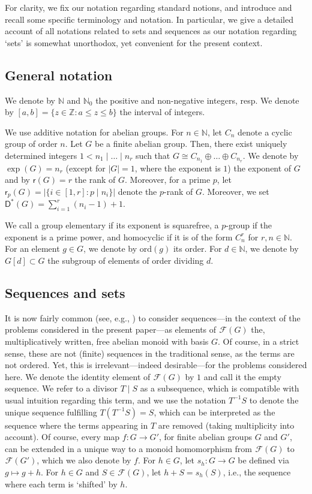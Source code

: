 \documentclass{amsart}
\theoremstyle{definition}
\numberwithin{equation}{section}
\begin{document}
For clarity, we fix our notation regarding standard notions, and
introduce and recall some specific terminology and notation.
In particular, we give a detailed account of all notations related
to sets and sequences as our notation regarding `sets' is somewhat unorthodox,
yet convenient for the present context.

\subsection{General notation}
We denote by $\mathbb{N}$ and $\mathbb{N}_0$ the positive and
non-negative integers, resp.
We denote by $[a,b]=\{z \in \mathbb{Z} \colon a \le z \le b\}$
the interval of integers.

We use additive notation for abelian groups.
For $n \in \mathbb{N}$, let $C_n$ denote a cyclic group of order $n$.
Let $G$ be a finite abelian group.
Then, there exist uniquely determined integers $1 < n_1 \mid \dots  \mid n_r $ such that
 $G\cong C_{n_1} \oplus\ldots \oplus C_{n_r}$.
We denote by  $\exp(G)=n_r$ (except for $|G|=1$, where the exponent is $1$) the exponent of $G$ and by $\mathsf{r}(G)=r$ the rank of $G$. Moreover, for a prime $p$, let $\mathsf{r}_p(G)=|\{i\in [1,r]\colon p \mid n_i\}|$ denote the $p$-rank of $G$.
Moreover, we set $\mathsf{D}^{\ast}(G)=\sum_{i=1}^r(n_i-1)+1$.

We call a group elementary if its exponent is squarefree, a $p$-group if the exponent is a prime power, and
homocyclic if it is of the form $C_n^r$ for $r,n \in \mathbb{N}$.
For an element $g\in G$, we denote by ${\mathrm{ord}}(g)$ its order.
For $d\in \mathbb{N}$, we denote by $G[d]\subset G$ the subgroup
of elements of order dividing $d$.

\subsection{Sequences and sets}

It is now fairly common (see, e.g., \cite{GaoGe1,barcelona,GeHaBOOK}) to consider sequences---in the context of the problems considered in the present paper---as elements of ${{}^{{}}\!\mathcal{F}}(G)$ the, multiplicatively written, free abelian monoid with basis $G$. Of course, in a strict sense, these are not (finite) sequences in the traditional sense, as the terms are not ordered. Yet, this is irrelevant---indeed desirable---for the problems considered here.
We denote the identity element of ${{}^{{}}\!\mathcal{F}} (G)$ by $1$ and call it the empty sequence. We refer to a divisor $T\mid S$ as a subsequence, which is compatible with usual intuition regarding this term, and we use the notation
$T^{-1}S$ to denote the unique sequence fulfilling $T (T^{-1}S)=S$, which can be interpreted as the sequence where the terms appearing in $T$ are removed (taking multiplicity into account).
Of course, every map $f:G \to G'$, for finite abelian groups $G$ and $G'$, can be extended in a unique way
to a monoid homomorphism from ${{}^{{}}\!\mathcal{F}}(G)$ to ${{}^{{}}\!\mathcal{F}}(G')$, which we also denote by $f$.
For $h\in G$, let $s_h: G \to G$ be defined via $g\mapsto g + h$. For $h \in G$ and $S \in {{}^{{}}\!\mathcal{F}} (G)$, let  $h+S=s_h(S)$, i.e., the sequence where each
term is `shifted' by $h$.
\end{document}
